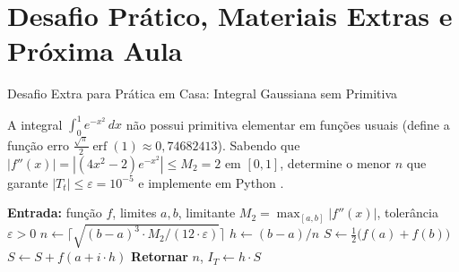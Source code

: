 \documentclass[aspectratio=169]{beamer}
\begin{document}
\section{Desafio Prático, Materiais Extras e Próxima Aula}

\begin{frame}{Desafio Extra para Prática em Casa: Integral Gaussiana sem Primitiva}
\footnotesize
\begin{bee}
A integral $\int_0^1 e^{-x^2}\,dx$ não possui primitiva elementar em funções usuais (define a função erro $\frac{\sqrt{\pi}}{2}\operatorname{erf}(1) \approx 0{,}74682413$). Sabendo que $|f''(x)| = |(4x^2 - 2)e^{-x^2}| \le M_2 = 2$ em $[0, 1]$, determine o menor $n$ que garante $|T_t| \le \varepsilon = 10^{-5}$ e implemente em Python \cite{chapra2016, cardoso2026_github}.
\end{bee}

\begin{bee}
\begin{algorithmic}[1]\scriptsize
\State \textbf{Entrada:} função $f$, limites $a, b$, limitante $M_2 = \max_{[a,b]} |f''(x)|$, tolerância $\varepsilon > 0$
\State $n \gets \lceil \sqrt{(b - a)^3 \cdot M_2 / (12 \cdot \varepsilon)} \rceil$ 
\State $h \gets (b - a) / n$
\State $S \gets \frac{1}{2}\big(f(a) + f(b)\big)$ 
    \State $S \gets S + f(a + i \cdot h)$ 
\EndFor
\State \textbf{Retornar} $n$, $I_T \gets h \cdot S$
\end{algorithmic}
\end{bee}
\end{frame}
\end{document}
